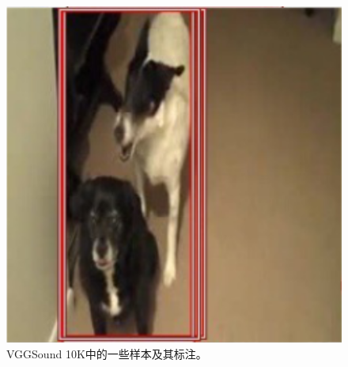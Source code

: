 \documentclass[12pt]{article}
\begin{document}
\begin{figure}[!h]
{\begin{minipage}[t]{0.3\linewidth}
  \includegraphics[width=1\linewidth]{v2.png}
  \end{minipage}%
  }%
  \caption{VGGSound 10K中的一些样本及其标注。}
\label{fig:vgg}
\end{figure}
\end{document}
